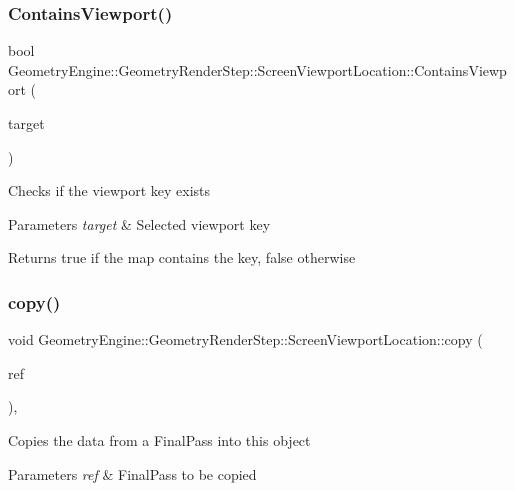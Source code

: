 \subsubsection{\texorpdfstring{ContainsViewport()}{ContainsViewport()}}
{\footnotesize\ttfamily bool Geometry\+Engine\+::\+Geometry\+Render\+Step\+::\+Screen\+Viewport\+Location\+::\+Contains\+Viewport (\begin{DoxyParamCaption}\item[{const \mbox{\hyperlink{namespace_geometry_engine_1_1_geometry_world_item_1_1_geometry_camera_a3766848bae97ff8203fa26907ac359ef}{Geometry\+World\+Item\+::\+Geometry\+Camera\+::\+Camera\+Targets}} \&}]{target }\end{DoxyParamCaption})}

Checks if the viewport key exists 
\begin{DoxyParams}{Parameters}
{\em target} & Selected viewport key \\
\hline
\end{DoxyParams}
\begin{DoxyReturn}{Returns}
true if the map contains the key, false otherwise 
\end{DoxyReturn}
\mbox{\label{class_geometry_engine_1_1_geometry_render_step_1_1_screen_viewport_location_ac84bf098c2402b2e920f7dcc798702dc}} 
\subsubsection{\texorpdfstring{copy()}{copy()}}
{\footnotesize\ttfamily void Geometry\+Engine\+::\+Geometry\+Render\+Step\+::\+Screen\+Viewport\+Location\+::copy (\begin{DoxyParamCaption}\item[{const \mbox{\hyperlink{class_geometry_engine_1_1_geometry_render_step_1_1_screen_viewport_location}{Screen\+Viewport\+Location}} \&}]{ref }\end{DoxyParamCaption})\hspace{0.3cm}{\ttfamily [protected]}, {\ttfamily [virtual]}}

Copies the data from a Final\+Pass into this object 
\begin{DoxyParams}{Parameters}
{\em ref} & Final\+Pass to be copied \\
\hline
\end{DoxyParams}
\mbox{\label{class_geometry_engine_1_1_geometry_render_step_1_1_screen_viewport_location_a84ffff22eb9d9ec9caf22682b05150f4}} 
